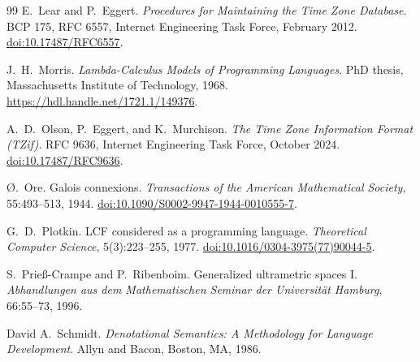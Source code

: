 \documentclass[11pt]{article}
\theoremstyle{plain}
\theoremstyle{definition}
\theoremstyle{remark}
\begin{document}
\begin{thebibliography}{99}
  E.\ Lear and P.\ Eggert.
  \emph{Procedures for Maintaining the Time Zone Database}.
  BCP 175, RFC 6557, Internet Engineering Task Force, February 2012.
  \href{https://doi.org/10.17487/RFC6557}{doi:10.17487/RFC6557}.

  J.\ H.\ Morris.
  \emph{Lambda-Calculus Models of Programming Languages}.
  PhD thesis, Massachusetts Institute of Technology, 1968.
  \href{https://hdl.handle.net/1721.1/149376}{https://hdl.handle.net/1721.1/149376}.

  A.\ D.\ Olson, P.\ Eggert, and K.\ Murchison.
  \emph{The Time Zone Information Format (TZif)}.
  RFC 9636, Internet Engineering Task Force, October 2024.
  \href{https://doi.org/10.17487/RFC9636}{doi:10.17487/RFC9636}.

  {\O}.\ Ore.
  Galois connexions.
  \emph{Transactions of the American Mathematical Society},
  55:493--513, 1944.
  \href{https://doi.org/10.1090/S0002-9947-1944-0010555-7}{doi:10.1090/S0002-9947-1944-0010555-7}.

  G.\ D.\ Plotkin.
  {LCF} considered as a programming language.
  \emph{Theoretical Computer Science},
  5(3):223--255, 1977.
  \href{https://doi.org/10.1016/0304-3975(77)90044-5}{doi:10.1016/0304-3975(77)90044-5}.

  S.\ Prie{\ss}-Crampe and P.\ Ribenboim.
  Generalized ultrametric spaces I.
  \emph{Abhandlungen aus dem Mathematischen Seminar der Universit\"at Hamburg},
  66:55--73, 1996.

  David A.\ Schmidt.
  \emph{Denotational Semantics: A Methodology for Language Development}.
  Allyn and Bacon, Boston, MA, 1986.


\end{thebibliography}
\end{document}
